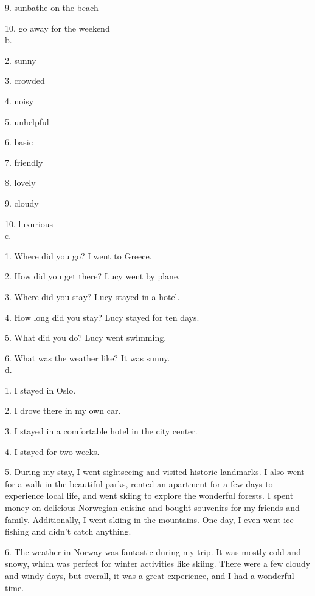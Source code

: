 \documentclass{article}
\begin{document}
9. sunbathe on the beach

10. go away for the weekend
\\
b.

2. sunny

3. crowded

4. noisy

5. unhelpful

6. basic

7. friendly

8. lovely

9. cloudy

10. luxurious
\\
c.

1. Where did you go? I went to Greece.

2. How did you get there?
Lucy went by plane.

3. Where did you stay?
Lucy stayed in a hotel.

4. How long did you stay?
Lucy stayed for ten days.

5. What did you do? Lucy went swimming.

6. What was the weather like? It was sunny.
\\
d. 

1. I stayed in Oslo.

2. I drove there in my own car.

3. I stayed in a comfortable hotel in the city center.

4. I stayed for two weeks.

5. During my stay, I went sightseeing and visited historic landmarks. I also went for a walk in the beautiful parks, rented an apartment for a few days to experience local life, and went skiing to explore the wonderful forests. I spent money on delicious Norwegian cuisine and bought souvenirs for my friends and family. Additionally, I went skiing in the mountains. One day, I even went ice fishing and didn't catch anything.

6. The weather in Norway was fantastic during my trip. It was mostly cold and snowy, which was perfect for winter activities like skiing. There were a few cloudy and windy days, but overall, it was a great experience, and I had a wonderful time.
\end{document}
